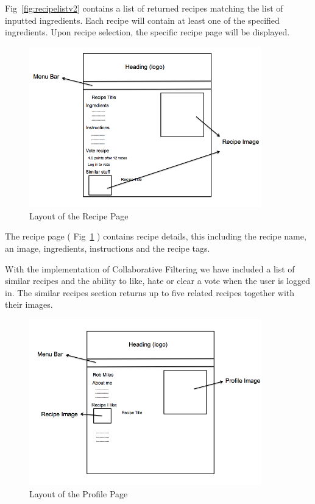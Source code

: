 Fig~\ref{fig:recipelistv2} contains a list of returned recipes matching the list of inputted ingredients. Each recipe will contain at least one of the specified ingredients. Upon recipe selection, the specific recipe page will be displayed.  

\begin{figure}[H]
\begin{center}
\includegraphics[width=0.9\textwidth]{recipe_page_v2}
\caption{Layout of the Recipe Page}
\label{fig:recipepagev2}
\end{center}
\end{figure}

The recipe page ( Fig~\ref{fig:recipepagev2} ) contains recipe details, this including the recipe name, an image, ingredients, instructions and the recipe tags. 

With the implementation of Collaborative Filtering we have included a list of similar recipes and the ability to like, hate or clear a vote when the user is logged in. The similar recipes section returns up to five related recipes together with their images. 

 
 \begin{figure}[H]
 \begin{center}
\includegraphics[width=0.9\textwidth]{profile_page_v2}
\caption{Layout of the Profile Page}
\label{fig:profilepagev2}
\end{center}
\end{figure}

